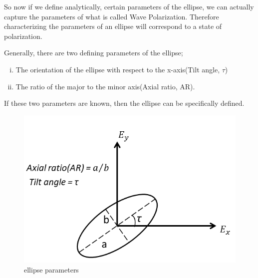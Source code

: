 So now if we define analytically, certain parameters of the ellipse, we can actually capture the parameters of what is called Wave Polarization. Therefore characterizing the parameters of an ellipse will correspond to a state of polarization.

Generally, there are two defining parameters of the ellipse;
\begin{enumerate}[(i)]
\item The orientation of the ellipse with respect to the x-axis(Tilt angle, $\tau$) 
\item The ratio of the major to the minor axis(Axial ratio, AR).
\end{enumerate}
If these two parameters are known, then the ellipse can be specifically defined.
\begin{figure}[h]
\centering
\includegraphics[width=1\linewidth]{./graphics/ellipse_parameters}
\caption{ellipse parameters}
\end{figure}

